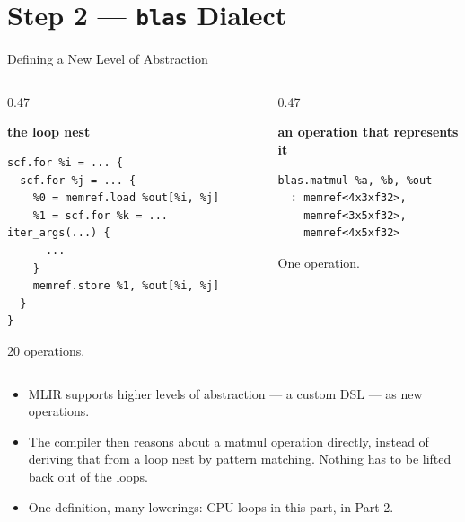 \documentclass[aspectratio=169,10pt]{beamer}
\begin{document}
\section{Step 2 --- \texttt{blas} Dialect}
\begin{frame}[plain]\sectionpage\end{frame}

\begin{frame}[fragile]{Defining a New Level of Abstraction}
  \begin{columns}[t]
    \begin{column}{0.47\textwidth}
      \begin{center}\small\textbf{the loop nest}\end{center}
\begin{lstlisting}[language=mlir,basicstyle=\ttfamily\scriptsize]
scf.for %i = ... {
  scf.for %j = ... {
    %0 = memref.load %out[%i, %j]
    %1 = scf.for %k = ... iter_args(...) {
      ...
    }
    memref.store %1, %out[%i, %j]
  }
}
\end{lstlisting}
      \begin{center}\scriptsize\color{scgrey}
        20 operations.
      \end{center}
    \end{column}
    \begin{column}{0.47\textwidth}
      \begin{center}\small\textbf{an operation that represents it}\end{center}
\begin{lstlisting}[language=mlir,basicstyle=\ttfamily\scriptsize]
blas.matmul %a, %b, %out
  : memref<4x3xf32>,
    memref<3x5xf32>,
    memref<4x5xf32>
\end{lstlisting}
      \begin{center}\scriptsize\color{scgrey}
        One operation.\end{center}
    \end{column}
  \end{columns}
  \vspace{0.5em}
  \begin{itemize}
    \item<3-> MLIR supports \alert{higher levels of abstraction} --- a
      custom DSL --- as new operations.
    \item<4-> The compiler then reasons about \alert{a matmul operation}
      directly, instead of deriving that from a loop nest by pattern
      matching. Nothing has to be lifted back out of the loops.
    \item<5-> One definition, \alert{many lowerings}: CPU loops in this part,
       in Part 2.
  \end{itemize}
\end{frame}
\end{document}
